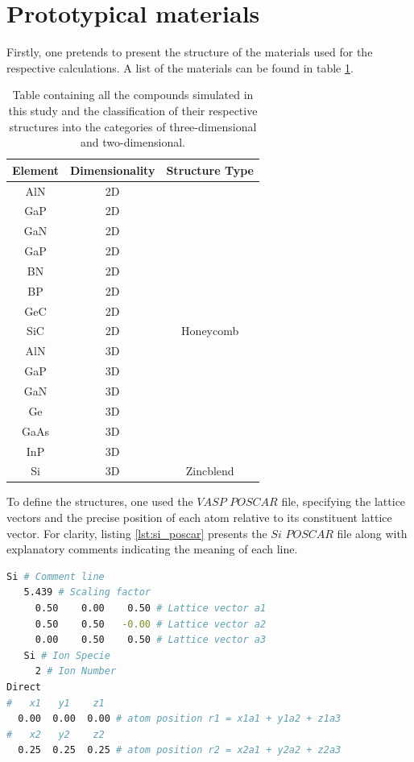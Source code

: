 \section{Prototypical materials}
Firstly, one pretends to present the structure of the materials used for the respective calculations. A list of the materials can be found in table \ref{tab:compounds}.
\begin{table}[h]
    \small
    \setlength{\tabcolsep}{5pt} %
    \renewcommand{\arraystretch}{1.2} %
    \centering
    \caption{Table containing all the compounds simulated in this study and the classification of their respective structures into the categories of three-dimensional and two-dimensional.}
    \label{tab:compounds}
    \begin{tabular}{c c c}
        \hline
        \hline
        \textbf{Element} & \textbf{Dimensionality} & \textbf{Structure Type}  \\
        \hline
        AlN & 2D& \\
        GaP & 2D& \\
        GaN & 2D& \\
        GaP & 2D& \\
        BN & 2D& \\
        BP & 2D& \\        
        GeC & 2D & \\
        SiC & 2D & \multirow{-8}{*}{Honeycomb} \\
        AlN & 3D& \\
        GaP & 3D& \\
        GaN & 3D& \\
        Ge & 3D & \\
        GaAs & 3D & \\
        InP & 3D & \\
        Si & 3D & \multirow{-7}{*}{Zincblend} \\
        \hline
        \hline
    \end{tabular}
\end{table}

To define the structures, one used the $VASP$ $POSCAR$ file, specifying the lattice vectors and the precise position of each atom relative to its constituent lattice vector. For clarity, listing \ref{lst:si_poscar} presents the $Si$ $POSCAR$ file along with explanatory comments indicating the meaning of each line.
\newpage
\begin{lstlisting}[language=bash,caption={POSCAR file for Si},linewidth=\linewidth,label={lst:si_poscar}]
Si # Comment line                                      
   5.439 # Scaling factor 
     0.50    0.00    0.50 # Lattice vector a1
     0.50    0.50   -0.00 # Lattice vector a2
     0.00    0.50    0.50 # Lattice vector a3
   Si # Ion Specie
     2 # Ion Number
Direct
#   x1   y1    z1 
  0.00  0.00  0.00 # atom position r1 = x1a1 + y1a2 + z1a3  
#   x2   y2    z2
  0.25  0.25  0.25 # atom position r2 = x2a1 + y2a2 + z2a3
\end{lstlisting}

